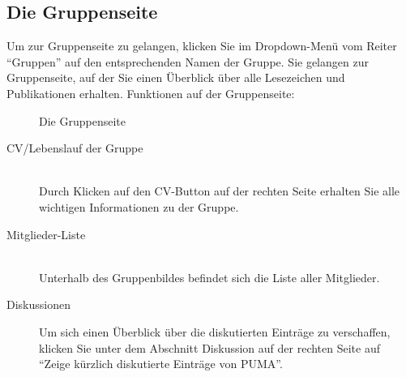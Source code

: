 \subsection{Die Gruppenseite}
\label{subsec:gruppenseite}
Um zur Gruppenseite zu gelangen, klicken Sie im Dropdown-Menü vom Reiter  \enquote{Gruppen} auf den entsprechenden Namen der Gruppe. Sie gelangen zur Gruppenseite, auf der Sie einen Überblick über alle Lesezeichen und Publikationen erhalten.%
\newline\newline
Funktionen auf der Gruppenseite:
\begin{figure}[h!]
 \centering
 \caption{Die Gruppenseite}
 \label{fig:gruppenseite}
\end{figure}
\begin{description}
\item [CV/Lebenslauf der Gruppe] \hfill \\
Durch Klicken auf den CV-Button auf der rechten Seite erhalten Sie alle wichtigen Informationen zu der Gruppe.
\item [Mitglieder-Liste] \hfill \\
Unterhalb des Gruppenbildes befindet sich die Liste aller Mitglieder. 
\item [Diskussionen] Um sich einen Überblick über die diskutierten Einträge zu verschaffen, klicken Sie unter dem Abschnitt Diskussion auf der rechten Seite auf \enquote{Zeige kürzlich diskutierte Einträge von PUMA}. 
\end{description}
 
